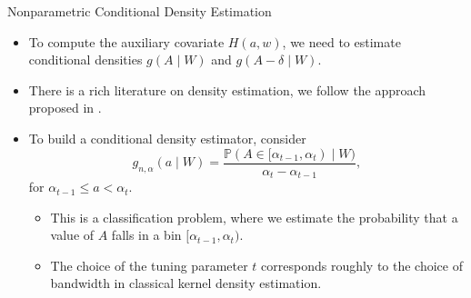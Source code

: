 \documentclass{beamer}
\newcommand{\pr}{\mathbb{P}}
\begin{document}
\begin{frame}[c]{Nonparametric Conditional Density Estimation}

\begin{center}
\begin{itemize}
  \itemsep8pt
  \item To compute the auxiliary covariate $H(a,w)$, we need to estimate
    conditional densities $g(A \mid W)$ and $g(A - \delta \mid W)$.
  \item There is a rich literature on density estimation, we follow the approach
    proposed in \cite{diaz2011super}.
  \item To build a conditional density estimator, consider
    \begin{equation*}
      g_{n, \alpha}(a \mid W) = \frac{\pr (A \in [\alpha_{t-1}, \alpha_t)
        \mid W)}{\alpha_t - \alpha_{t-1}},
    \end{equation*}
    for $\alpha_{t-1} \leq a < \alpha_t$.
    \vspace{0.5em}
    \begin{itemize}
      \itemsep4pt
      \item This is a classification problem, where we estimate the probability
        that a value of $A$ falls in a bin $[\alpha_{t-1}, \alpha_t)$.
      \item The choice of the tuning parameter $t$ corresponds roughly to the
        choice of bandwidth in classical kernel density estimation.
    \end{itemize}
\end{itemize}
\end{center}

\note{
}

\end{frame}

\end{document}
